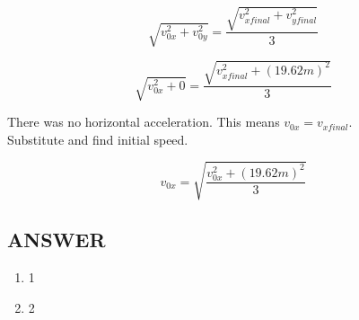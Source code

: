 $$ \sqrt{v_{0x}^2 + v_{0y}^2} = \frac{\sqrt{v_{xfinal}^2 + v_{yfinal}^2}}{3} $$

$$ \sqrt{v_{0x}^2 + 0} = \frac{\sqrt{v_{xfinal}^2 + (19.62m)^2}}{3} $$

There was no horizontal acceleration. This means $v_{0x} = v_{xfinal}$.
\\ Substitute and find initial speed.

$$v_{0x} = \sqrt{\frac{v_{0x}^2 + (19.62m)^2}{3}}$$












\vfill
\subsection*{ANSWER}
\begin{enumerate}
    \item 1
    \item 2
\end{enumerate}